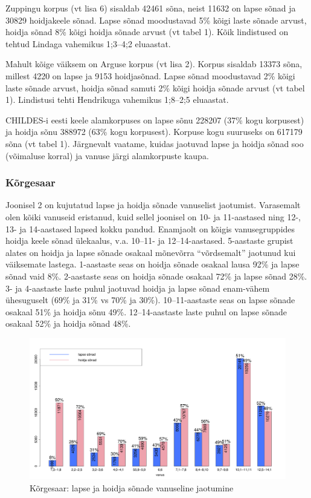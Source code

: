 \documentclass[12pt]{article}
\begin{document}
Zuppingu korpus (vt lisa 6) sisaldab 42461 sõna, neist 11632 on lapse sõnad ja 30829 hoidjakeele sõnad. Lapse sõnad moodustavad 5\% kõigi laste sõnade arvust, hoidja sõnad 8\% kõigi hoidja sõnade arvust (vt tabel 1). Kõik lindistused on tehtud Lindaga vahemikus 1;3--4;2 eluaastat. 

Mahult kõige väiksem on Arguse korpus (vt lisa 2). Korpus sisaldab 13373 sõna, millest 4220 on lapse ja 9153 hoidjasõnad. Lapse sõnad moodustavad 2\% kõigi laste sõnade arvust, hoidja sõnad samuti 2\% kõigi hoidja sõnade arvust (vt tabel 1). Lindistusi tehti Hendrikuga vahemikus 1;8--2;5 eluaastat.

CHILDES-i eesti keele alamkorpuses on lapse sõnu 228207 (37\% kogu korpusest) ja hoidja sõnu 388972 (63\% kogu korpusest). Korpuse kogu suuruseks on 617179 sõna (vt tabel 1). Järgnevalt vaatame, kuidas jaotuvad lapse ja hoidja sõnad soo (võimaluse korral) ja vanuse järgi alamkorpuste kaupa.


\subsubsection{Kõrgesaar}

Joonisel 2 on kujutatud lapse ja hoidja sõnade vanuselist jaotumist. Varasemalt olen kõiki vanuseid eristanud, kuid sellel joonisel on 10- ja 11-aastased ning 12-, 13- ja 14-aastased lapsed kokku pandud. Enamjaolt on kõigis vanusegruppides hoidja keele sõnad ülekaalus, v.a. 10--11- ja 12--14-aastased. 5-aastaste grupist alates on hoidja ja lapse sõnade osakaal mõnevõrra ``võrdsemalt'' jaotunud kui väiksemate lastega. 1-aastaste seas on hoidja sõnade osakaal lausa 92\% ja lapse sõnad vaid 8\%. 2-aastaste seas on hoidja sõnade osakaal 72\% ja lapse sõnad 28\%. 3- ja 4-aastaste laste puhul jaotuvad hoidja ja lapse sõnad enam-vähem ühesuguselt (69\% ja 31\% vs 70\% ja 30\%). 10--11-aastaste seas on lapse sõnade osakaal 51\% ja hoidja sõnu 49\%. 12--14-aastaste laste puhul on lapse sõnade osakaal 52\% ja hoidja sõnad 48\%.

\begin{figure}[H]
    \centering
    \includegraphics[width=\textwidth]{korgesaar_vanus_sonad}
    \caption{Kõrgesaar: lapse ja hoidja sõnade vanuseline jaotumine}
\end{figure}
\end{document}
